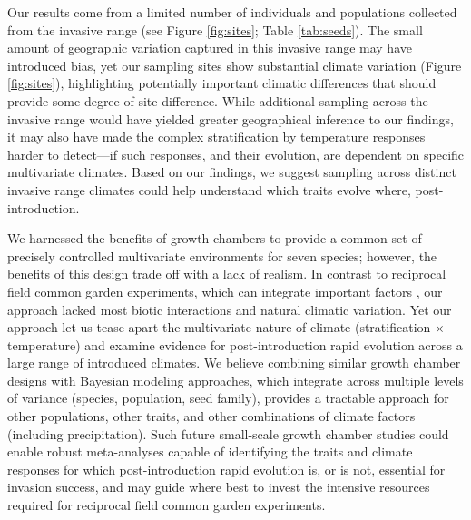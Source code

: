 \documentclass[11pt]{article}\usepackage[]{graphicx}\usepackage[]{color}
\begin{document}
	Our results come from a limited number of individuals and populations collected from the invasive range (see Figure \ref{fig:sites}; Table \ref{tab:seeds}). The small amount of geographic variation captured in this invasive range may have introduced bias, yet our sampling sites show substantial climate variation (Figure \ref{fig:sites}), highlighting potentially important climatic differences that should provide some degree of site difference.  While additional sampling across the invasive range would have yielded greater geographical inference to our findings, it may also have made the complex stratification by temperature responses harder to detect---if such responses, and their evolution, are dependent on specific multivariate climates. Based on our findings, we suggest sampling across distinct invasive range climates could help understand which traits evolve where, post-introduction. %
	
	We harnessed the benefits of growth chambers to provide a common set of precisely controlled multivariate environments for seven species; however, the benefits of this design trade off with a lack of realism. In contrast to reciprocal field common garden experiments, which can integrate important factors \parencite{Germain2018,Blois2013}, our approach lacked most biotic interactions and natural climatic variation. Yet our approach let us tease apart the multivariate nature of climate (stratification $\times$ temperature) and examine evidence for post-introduction rapid evolution across a large range of introduced climates. We believe combining similar growth chamber designs with Bayesian modeling approaches, which integrate across multiple levels of variance (species, population, seed family), provides a tractable approach for other populations, other traits, and other combinations of climate factors (including precipitation). Such future small-scale growth chamber studies could enable robust meta-analyses capable of identifying the traits and climate responses for which post-introduction rapid evolution is, or is not, essential for invasion success, and may guide where best to invest the intensive resources required for reciprocal field common garden experiments. 
	
\end{document}
